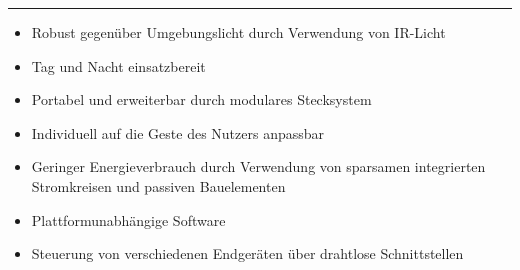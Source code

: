 \documentclass[a4paper,12pt,notumble]{leaflet}
\begin{document}
\textcolor{rwth-lblue}{\noindent\rule{\textwidth}{4pt}}

\noindent
\begin{minipage}[c][0.32\textheight][t]{\textwidth}
	\begin{itemize}
		\item Robust gegenüber Umgebungslicht durch Verwendung von IR-Licht 
		\item Tag und Nacht einsatzbereit
		\item Portabel und erweiterbar durch modulares Stecksystem
		\item Individuell auf die Geste des Nutzers anpassbar
		\item Geringer Energieverbrauch durch Verwendung von sparsamen integrierten Stromkreisen und passiven Bauelementen
		\item Plattformunabhängige Software
		\item Steuerung von verschiedenen Endgeräten über drahtlose Schnittstellen
	\end{itemize}
\end{minipage}

\clearpage


\end{document}
